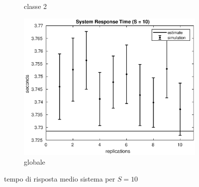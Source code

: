 \begin{figure}[!h]
\begin{subfigure}[t]{0.49\textwidth}
\caption{classe 2}
\label{10_s2}
\end{subfigure}
%
\begin{subfigure}[t]{0.5\textwidth}
\includegraphics[width=\textwidth]{figures/simul/10_500K_s}
\caption{globale}
\label{10_s}
\end{subfigure}
%
\caption{tempo di risposta medio sistema per $S = 10$}
\end{figure}
%

